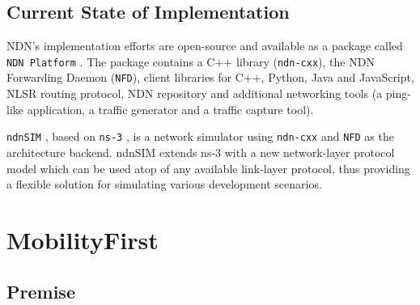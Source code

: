 

        \subsection{Current State of Implementation}

            NDN's implementation efforts are open-source and available as a package called \texttt{NDN Platform} \cite{ndn_platform}. The package contains a C++ library (\texttt{ndn-cxx}), the NDN Forwarding Daemon (\texttt{NFD}), client libraries for C++, Python, Java and JavaScript, NLSR routing protocol, NDN repository and additional networking tools (a ping-like application, a traffic generator and a traffic capture tool).

            \texttt{ndnSIM} \cite{ndn_sim}, based on \texttt{ns-3} \cite{ns3}, is a network simulator using \texttt{ndn-cxx} and \texttt{NFD} as the architecture backend. ndnSIM extends ns-3 with a new network-layer protocol model which can be used atop of any available link-layer protocol, thus providing a flexible solution for simulating various development scenarios.


    \section{MobilityFirst}\label{archs:mf}

        \subsection{Premise}

